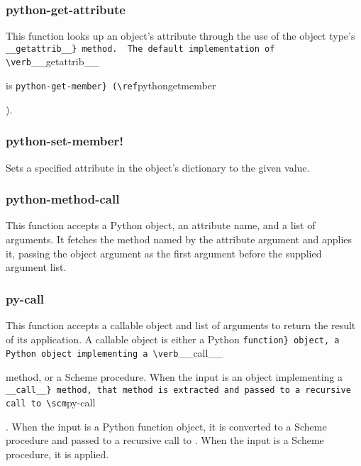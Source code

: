 {{{{\subsubsection{python-get-attribute}

This function looks up an object's attribute through the use of the object type's \verb{__getattrib__} method.  The default implementation of \verb{__getattrib__} is \verb{python-get-member} (\ref{pythongetmember}).


\subsubsection{python-set-member!}

Sets a specified attribute in the object's dictionary to the given value.


\subsubsection{python-method-call}

This function accepts a Python object, an attribute name, and a list of arguments.  It fetches the method named by the attribute argument and applies it, passing the object argument as the first argument before the supplied argument list.

\subsubsection{py-call}
\label{pycall}

This function accepts a callable object and list of arguments to return the result of its application.  A callable object is either a Python \verb{function} object, a Python object implementing a \verb{__call__} method, or a Scheme procedure.  When the input is an object implementing a \verb{__call__} method, that method is extracted and passed to a recursive call to \scm{py-call}.  When the input is a Python function object, it is converted to a Scheme procedure and passed to a recursive call to .  When the input is a Scheme procedure, it is applied.
